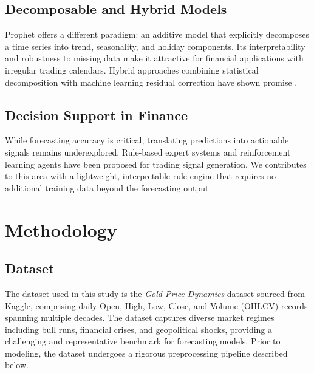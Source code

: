 \documentclass[journal,comsoc]{IEEEtran}
\begin{document}
\subsection{Decomposable and Hybrid Models}
Prophet offers a different paradigm: an additive model that explicitly decomposes a time series into trend, seasonality, and holiday components. Its interpretability and robustness to missing data make it attractive for financial applications with irregular trading calendars. Hybrid approaches combining statistical decomposition with machine learning residual correction have shown promise \cite{chen2009overview}.

\subsection{Decision Support in Finance}
While forecasting accuracy is critical, translating predictions into actionable signals remains underexplored. Rule-based expert systems and reinforcement learning agents have been proposed for trading signal generation. We contributes to this area with a lightweight, interpretable rule engine that requires no additional training data beyond the forecasting output.

\section{Methodology}

\subsection{Dataset}
The dataset used in this study is the \textit{Gold Price Dynamics} dataset sourced from Kaggle, comprising daily Open, High, Low, Close, and Volume (OHLCV) records spanning multiple decades. The dataset captures diverse market regimes including bull runs, financial crises, and geopolitical shocks, providing a challenging and representative benchmark for forecasting models. Prior to modeling, the dataset undergoes a rigorous preprocessing pipeline described below.
\end{document}

